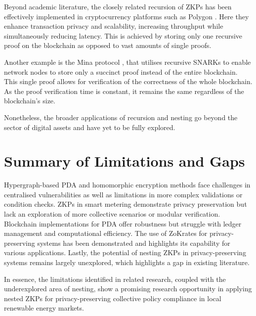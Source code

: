 Beyond academic literature, the closely related recursion of ZKPs has been effectively implemented in cryptocurrency platforms such as Polygon \cite{polygonzkEVM}. Here they enhance transaction privacy and scalability, increasing throughput while simultaneously reducing latency. This is achieved by storing only one recursive proof on the blockchain as opposed to vast amounts of single proofs.

Another example is the Mina protocol \cite{minaprotocol}, that utilises recursive SNARKs to enable network nodes to store only a succinct proof instead of the entire blockchain. This single proof allows for verification of the correctness of the whole blockchain. As the proof verification time is constant, it remains the same regardless of the blockchain's size.

Nonetheless, the broader applications of recursion and nesting go beyond the sector of digital assets and have yet to be fully explored.

\section{Summary of Limitations and Gaps}

Hypergraph-based PDA and homomorphic encryption methods face challenges in centralised vulnerabilities as well as limitations in more complex validations or condition checks. ZKPs in smart metering demonstrate privacy preservation but lack an exploration of more collective scenarios or modular verification. Blockchain implementations for PDA offer robustness but struggle with ledger management and computational efficiency. The use of ZoKrates for privacy-preserving systems has been demonstrated and highlights its capability for various applications. Lastly, the potential of nesting ZKPs in privacy-preserving systems remains largely unexplored, which highlights a gap in existing literature.

In essence, the limitations identified in related research, coupled with the underexplored area of nesting, show a promising research opportunity in applying nested ZKPs for privacy-preserving collective policy compliance in local renewable energy markets.